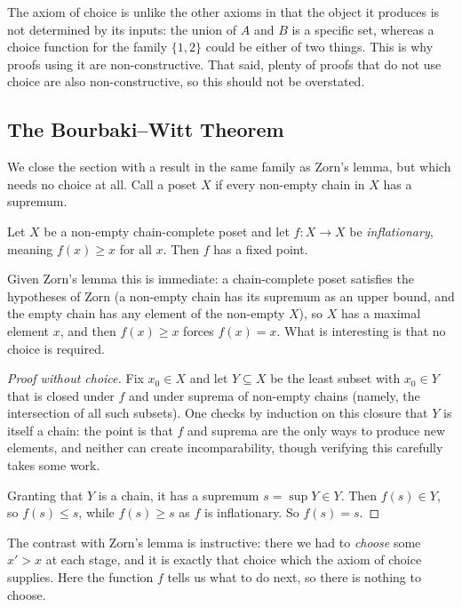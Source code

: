 \documentclass[a4paper]{scrartcl}
\begin{document}
The axiom of choice is unlike the other axioms in that the object it produces is not determined by its inputs: the union of $A$ and $B$ is a specific set, whereas a choice function for the family $\{1, 2\}$ could be either of two things. This is why proofs using it are non-constructive. That said, plenty of proofs that do not use choice are also non-constructive, so this should not be overstated.

\subsection{The Bourbaki--Witt Theorem}

We close the section with a result in the same family as Zorn's lemma, but which needs no choice at all. Call a poset $X$  if every non-empty chain in $X$ has a supremum.

\begin{theorem}
  Let $X$ be a non-empty chain-complete poset and let $f: X \to X$ be \emph{inflationary}, meaning $f(x) \geq x$ for all $x$. Then $f$ has a fixed point.
\end{theorem}

Given Zorn's lemma this is immediate: a chain-complete poset satisfies the hypotheses of Zorn (a non-empty chain has its supremum as an upper bound, and the empty chain has any element of the non-empty $X$), so $X$ has a maximal element $x$, and then $f(x) \geq x$ forces $f(x) = x$. What is interesting is that no choice is required.

\begin{proof}[Proof without choice]
  Fix $x_0 \in X$ and let $Y \subseteq X$ be the least subset with $x_0 \in Y$ that is closed under $f$ and under suprema of non-empty chains (namely, the intersection of all such subsets). One checks by induction on this closure that $Y$ is itself a chain: the point is that $f$ and suprema are the only ways to produce new elements, and neither can create incomparability, though verifying this carefully takes some work.

  Granting that $Y$ is a chain, it has a supremum $s = \sup Y \in Y$. Then $f(s) \in Y$, so $f(s) \leq s$, while $f(s) \geq s$ as $f$ is inflationary. So $f(s) = s$.
\end{proof}

The contrast with Zorn's lemma is instructive: there we had to \emph{choose} some $x' > x$ at each stage, and it is exactly that choice which the axiom of choice supplies. Here the function $f$ tells us what to do next, so there is nothing to choose.
\end{document}
